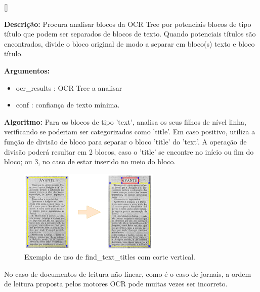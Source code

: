 [\normalsize]

\textbf{Descrição:} Procura analisar blocos da OCR Tree por potenciais blocos de tipo título que podem ser separados de blocos de texto. Quando potenciais títulos são encontrados, divide o bloco original de modo a separar em bloco(s) texto e bloco título.

\textbf{Argumentos:}
\begin{itemize}\setlength\itemsep{-0.3em}
	\item ocr\_results : OCR Tree a analisar
	\item conf : confiança de texto mínima.
\end{itemize}

\textbf{Algoritmo:} Para os blocos de tipo 'text', analisa os seus filhos de nível linha, verificando se poderiam ser categorizados como 'title'. Em caso positivo, utiliza a função de divisão de bloco para separar o bloco 'title' do 'text'. A operação de divisão poderá resultar em 2 blocos, caso o 'title' se encontre no início ou fim do bloco; ou 3, no caso de estar inserido no meio do bloco.


\begin{figure}[H]
	\centering
	\includegraphics[width=0.6\textwidth]{images/ilustracoes/find_titles_blocks.png}
	\caption{Exemplo de uso de find\_text\_titles com corte vertical.}
	\label{fig:find_titles_blocks}
\end{figure}



\label{contribution_reading_order}

No caso de documentos de leitura não linear, como é o caso de jornais, a ordem de leitura proposta pelos motores OCR pode muitas vezes ser incorreto.

